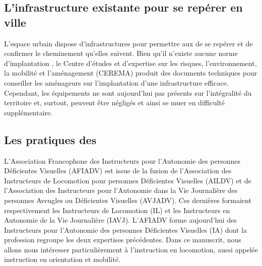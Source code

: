 \todo{}

\subsection{L'infrastructure existante pour se repérer en ville}

\label{ea_infrastructure}

L'espace urbain dispose d'infrastructures pour permettre aux \pcdvs de se repérer et de confirmer le cheminement qu'elles suivent. Bien qu'il n'existe aucune norme d'implantation , le Centre d'études et d'expertise sur les risques, l'environnement, la mobilité et l'aménagement (CEREMA) produit des documents techniques pour conseiller les aménageurs sur l'implantation d'une infrastructure efficace. Cependant, les équipements ne sont aujourd'hui pas présents sur l'intégralité du territoire et, surtout, peuvent être négligés et ainsi se muer en difficulté supplémentaire.

\todo{}

\subsection{Les pratiques des \ipas{}}

\label{pratiques_ipas}

L'Association Francophone des Instructeurs pour l'Autonomie des personnes Déficientes Visuelles (AFIADV) est issue de la fusion de l'Association des Instructeurs de Locomotion pour personnes Déficientes Visuelles (AILDV) et de l'Association des Instructeurs pour l'Autonomie dans la Vie Journalière des personnes Aveugles ou Déficientes Visuelles (AVJADV). Ces dernières formaient respectivement les Instructeurs de Locomotion (IL) et les Instructeurs en Autonomie de la Vie Journalière (IAVJ). L'AFIADV forme aujourd'hui des Instructeurs pour l'Autonomie des personnes Déficientes Visuelles (IA) dont la profession regroupe les deux expertises précédentes. Dans ce manuscrit, nous allons nous intéresser particulièrement à l'instruction en locomotion, aussi appelée instruction en orientation et mobilité. 

